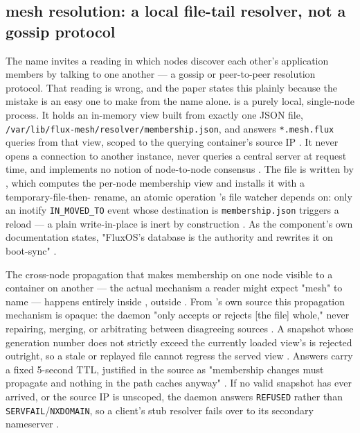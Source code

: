 \subsection{\fluxdnsd mesh resolution: a local file-tail resolver, not a gossip protocol}
\label{sec:networking-dnsd}

The name \fluxdnsd invites a reading in which nodes discover each other's application members by
talking to one another — a gossip or peer-to-peer resolution protocol. That reading is wrong, and
the paper states this plainly because the mistake is an easy one to make from the name alone.
\fluxdnsd is a purely local, single-node process. It holds an in-memory view built from exactly one
JSON file, \texttt{/\allowbreak{}var/\allowbreak{}lib/\allowbreak{}flux-mesh/\allowbreak{}resolver/\allowbreak{}membership.\allowbreak{}json}, and answers
\texttt{*.mesh.flux} queries from that view, scoped to the querying container's source IP
. It never opens a connection to another
\fluxdnsd instance, never queries a central server at request time, and implements no notion of
node-to-node consensus . The file is written by
\FluxOS, which computes the per-node membership view and installs it with a temporary-file-then-
rename, an atomic operation \fluxdnsd's file watcher depends on: only an inotify
\texttt{IN\_MOVED\_TO} event whose destination is \texttt{membership.\allowbreak{}json} triggers a reload —
a plain write-in-place is inert by construction
. As the component's own documentation states,
"FluxOS's database is the authority and rewrites it on boot-sync"
. \shipped

The cross-node propagation that makes membership on one node visible to a container on another —
the actual mechanism a reader might expect "mesh" to name — happens entirely inside \FluxOS,
outside \fluxdnsd. From \fluxdnsd's own source this propagation mechanism is opaque: the daemon
"only accepts or rejects [the file] whole," never repairing, merging, or arbitrating between
disagreeing sources 
. A snapshot whose generation number does not strictly
exceed the currently loaded view's is rejected outright, so a stale or replayed file cannot
regress the served view . Answers carry a fixed
5-second TTL, justified in the source as "membership changes must propagate and nothing in the
path caches anyway" . If no valid snapshot has ever
arrived, or the source IP is unscoped, the daemon answers \texttt{REFUSED} rather than
\texttt{SERVFAIL}\slash\texttt{NXDOMAIN}, so a client's stub resolver fails over to its secondary
nameserver . \shipped

